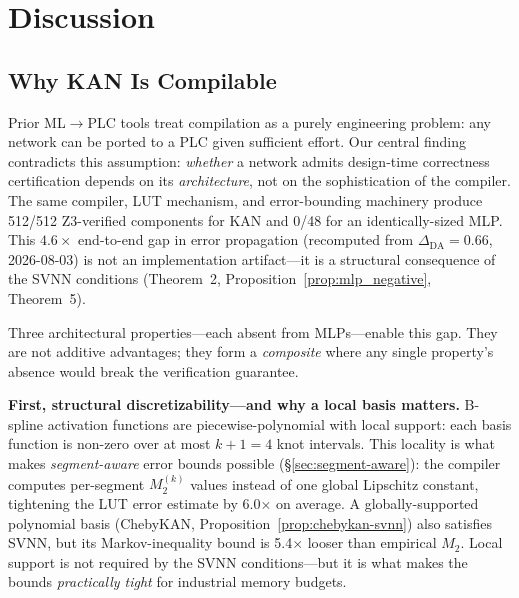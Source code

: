 \documentclass[journal,onecolumn]{IEEEtran}
\begin{document}
\section{Discussion}
\label{sec:discussion}

\subsection{Why KAN Is Compilable}

Prior ML$\to$PLC tools treat compilation as a purely engineering problem:
any network can be ported to a PLC given sufficient effort. Our central
finding contradicts this assumption: \textit{whether} a network admits
design-time correctness certification depends on its \textit{architecture},
not on the sophistication of the compiler. The same compiler, LUT mechanism,
and error-bounding machinery produce 512/512 Z3-verified components for KAN
and 0/48 for an identically-sized MLP. This $4.6\times$ end-to-end gap
in error propagation (recomputed from $\Delta_{\text{DA}} = 0.66$,
2026-08-03) is not an implementation
artifact---it is a structural consequence of the SVNN conditions
(Theorem~2, Proposition~\ref{prop:mlp_negative}, Theorem~5).

Three architectural properties---each absent from MLPs---enable this gap.
They are not additive advantages; they form a \textit{composite} where any
single property's absence would break the verification guarantee.

\textbf{First, structural discretizability---and why a local basis matters.}
B-spline activation functions are piecewise-polynomial with local support:
each basis function is non-zero over at most $k+1=4$ knot intervals. This
locality is what makes \textit{segment-aware} error bounds possible
({\S}\ref{sec:segment-aware}): the compiler computes per-segment $M_2^{(k)}$
values instead of one global Lipschitz constant, tightening the LUT error
estimate by 6.0$\times$ on average. A globally-supported polynomial basis
(ChebyKAN, Proposition~\ref{prop:chebykan-svnn}) also satisfies SVNN, but its Markov-inequality
bound is 5.4$\times$ looser than empirical $M_2$. Local support is not
required by the SVNN conditions---but it is what makes the bounds
\textit{practically tight} for industrial memory budgets.
\end{document}
